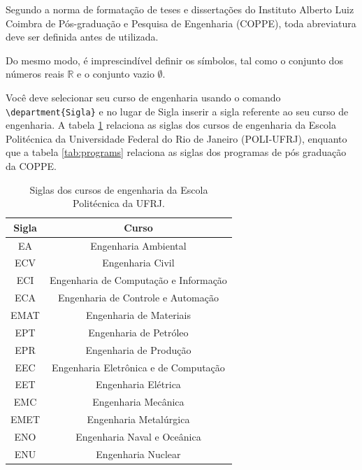 \documentclass[grad,numbers]{coppe}
\begin{document}
  Segundo a norma de formatação de teses e dissertações do
  Instituto Alberto Luiz Coimbra de Pós-graduação e Pesquisa de
  Engenharia (COPPE), toda abreviatura deve ser definida antes de
  utilizada.

  Do mesmo modo, é imprescindível definir os símbolos, tal como o
  conjunto dos números reais $\mathbb{R}$ e o conjunto vazio $\emptyset$.
  
  Você deve selecionar seu curso de engenharia usando o comando \texttt{\textbackslash department\{Sigla\}} e no lugar de Sigla inserir a sigla referente ao seu curso de engenharia. A tabela \ref{tab:courses} relaciona as siglas dos cursos de engenharia da Escola Politécnica da Universidade Federal do Rio de Janeiro (POLI-UFRJ), enquanto que a tabela \ref{tab:programs} relaciona as siglas dos programas de pós graduação da COPPE.
  
  
  \begin{table}[h]
    \caption{Siglas dos cursos de engenharia da Escola Politécnica da UFRJ.}
    \label{tab:courses}
    \centering
    {\footnotesize
    \begin{tabular}{|c|c|}
      \hline
      Sigla & Curso\\
      \hline
      EA &  Engenharia Ambiental \\
      ECV & Engenharia Civil\\
      ECI & Engenharia de Computação e Informação \\
      ECA & Engenharia de Controle e Automação \\
      EMAT & Engenharia de Materiais\\
      EPT & Engenharia de Petróleo\\
      EPR & Engenharia de Produção\\
      EEC & Engenharia Eletrônica e de Computação\\
      EET & Engenharia Elétrica\\
      EMC & Engenharia Mecânica\\
      EMET & Engenharia Metalúrgica\\
      ENO & Engenharia Naval e Oceânica\\
      ENU & Engenharia Nuclear\\
      \hline
    \end{tabular}}
    \end{table}
    
\end{document}

